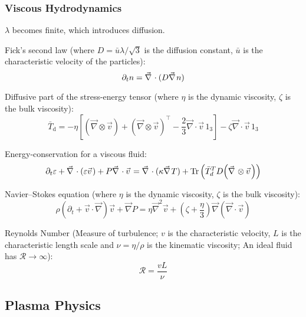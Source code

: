 		\subsubsection{Viscous Hydrodynamics}
			$\lambda$ becomes finite, which introduces diffusion.

			Fick's second law (where $D = \bar{u} \lambda/\sqrt{3}$ is the diffusion constant, $\bar{u}$ is the characteristic velocity of the particles):
			\begin{equation}
				\partial_t n = \Nabla \cdot (D \Nabla n)
			\end{equation}

			\noindent
			Diffusive part of the stress-energy tensor (where $\eta$ is the dynamic viscosity, $\zeta$ is the bulk viscosity):
			\begin{equation}
				\bar{T}_{\mathrm{d}}=-\eta\left[\left(\vec{\nabla}\otimes\vec{v}\right)+\left(\vec{\nabla}\otimes\vec{v}\right)^{\intercal}-\frac{2}{3}\vec{\nabla}\cdot\vec{v}\,1_{3}\right]-\zeta\vec{\nabla}\cdot\vec{v}\,1_{3}
			\end{equation}

			\noindent
			Energy-conservation for a viscous fluid:
			\begin{equation}
				\partial_t \varepsilon + \Nabla \cdot (\varepsilon \vec{v}) + P \Nabla \cdot \vec{v} = \Nabla \cdot (\kappa \Nabla T) + \tr\qty(\bar{T}_d^T D \qty(\Nabla \otimes\vec{v}))
			\end{equation}

			\noindent
			Navier--Stokes equation (where $\eta$ is the dynamic viscosity, $\zeta$ is the bulk viscosity):
			\begin{equation}
				\rho\left(\partial_{t}+\vec{v}\cdot\vec{\nabla}\right)\vec{v}+\vec{\nabla}P=\eta\vec{\nabla}^{2}\vec{v}+\left(\zeta+\frac{\eta}{3}\right)\vec{\nabla}\left(\vec{\nabla}\cdot\vec{v}\right)
			\end{equation}

			\noindent
			Reynolds Number (Measure of turbulence; $v$ is the characteristic velocity, $L$ is the characteristic length scale and $\nu = \eta / \rho$ is the kinematic viscosity; An ideal fluid has $\mathcal{R} \to \infty$):
			\begin{equation}
				\mathcal{R} = \frac{v L}{\nu}
			\end{equation}

	\subsection{Plasma Physics}
